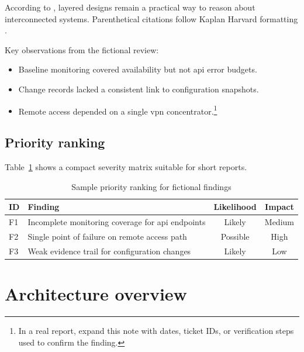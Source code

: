\documentclass[12pt, a4paper]{article}
\begin{document}
According to \citet{Kurose2021}, layered designs remain a practical way
to reason about interconnected systems. Parenthetical citations follow
Kaplan Harvard formatting \citep{Tanenbaum2021,NIST2020}.

Key observations from the fictional review:
\begin{itemize}[leftmargin=1.5em]
  \item Baseline monitoring covered availability but not \gls{api} error budgets.
  \item Change records lacked a consistent link to configuration snapshots.
  \item Remote access depended on a single \gls{vpn} concentrator.\footnote{In a
        real report, expand this note with dates, ticket IDs, or verification
        steps used to confirm the finding.}
\end{itemize}

\subsection{Priority ranking}
\label{subsec:findings-priority}

Table~\ref{tab:sample-priorities} shows a compact severity matrix suitable
for short reports.

\begin{table}[H]
  \centering
  \caption{Sample priority ranking for fictional findings}
  \label{tab:sample-priorities}
  \begin{tabularx}{\textwidth}{l X c c}
    \toprule
    \textbf{ID} & \textbf{Finding} & \textbf{Likelihood} & \textbf{Impact} \\
    \midrule
    F1 & Incomplete monitoring coverage for \acrshort{api} endpoints & Likely & Medium \\
    F2 & Single point of failure on remote access path & Possible & High \\
    F3 & Weak evidence trail for configuration changes & Likely & Low \\
    \bottomrule
  \end{tabularx}
\end{table}


\section{Architecture overview}
\label{sec:architecture}
\end{document}
